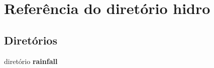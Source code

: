 \section{Referência do diretório hidro}
\label{dir_8f69415ca2e3451461698781a73e6b65}
\subsection*{Diretórios}
\begin{DoxyCompactItemize}
\item 
diretório {\bf rainfall}
\end{DoxyCompactItemize}
